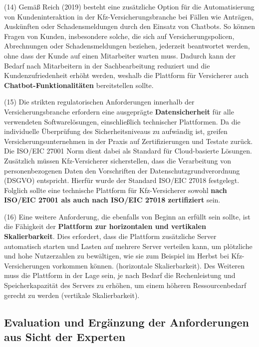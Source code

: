 (14) Gemäß Reich (2019) besteht eine zusätzliche Option für die Automatisierung von Kundeninteraktion in der Kfz-Versicherungsbranche bei Fällen wie Anträgen, Auskünften oder Schadensmeldungen durch den Einsatz von Chatbots. So können Fragen von Kunden, insbesondere solche, die sich auf Versicherungspolicen, Abrechnungen oder Schadensmeldungen beziehen, jederzeit beantwortet werden, ohne dass der Kunde auf einen Mitarbeiter warten muss. Dadurch kann der Bedarf nach Mitarbeitern in der Sachbearbeitung reduziert und die Kundenzufriedenheit erhöht werden, weshalb die Plattform für Versicherer auch \textbf{Chatbot-Funktionalitäten} bereitstellen sollte. \autocite[Vgl.][S. 300-302]{REICH2019}

(15) Die strikten regulatorischen Anforderungen innerhalb der Versicherungsbranche erfordern eine ausgeprägte \textbf{Datensicherheit} für alle verwendeten Softwarelösungen, einschließlich technischer Plattformen. Da die individuelle Überprüfung des Sicherheitsniveaus zu aufwändig ist, greifen Versicherungsunternehmen in der Praxis auf Zertifizierungen und Testate zurück. \autocite[Vgl.][S. 777]{ZDANOWIECKI2016} Die ISO/EIC 27001 Norm dient dabei als Standard für Cloud-basierte Lösungen. Zusätzlich müssen Kfz-Versicherer sicherstellen, dass die Verarbeitung von personenbezogenen Daten den Vorschriften der Datenschutzgrundverordnung (DSGVO) entspricht. Hierfür wurde der Standard ISO/EIC 27018 festgelegt. Folglich sollte eine technische Plattform für Kfz-Versicherer sowohl \textbf{nach ISO/EIC 27001 als auch nach ISO/EIC 27018 zertifiziert} sein. 

(16) Eine weitere Anforderung, die ebenfalls von Beginn an erfüllt sein sollte, ist die Fähigkeit der \textbf{Plattform zur horizontalen und vertikalen Skalierbarkeit}. Dies erfordert, dass die Plattform zusätzliche Server automatisch starten und Lasten auf mehrere Server verteilen kann, um plötzliche und hohe Nutzerzahlen zu bewältigen, wie sie zum Beispiel im Herbst bei Kfz-Versicherungen vorkommen können. (horizontale Skalierbarkeit). Des Weiteren muss die Plattform in der Lage sein, je nach Bedarf die Rechenleistung und Speicherkapazität des Servers zu erhöhen, um einem höheren Ressourcenbedarf gerecht zu werden (vertikale Skalierbarkeit). \autocite[Vgl.][S. 23]{JAHNERT2020}

\subsection{Evaluation und Ergänzung der Anforderungen aus Sicht der Experten}

